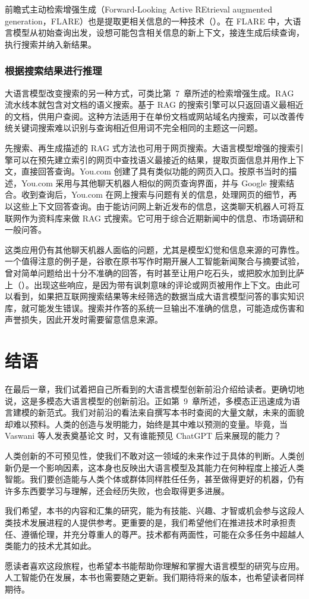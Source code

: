 前瞻式主动检索增强生成（Forward-Looking Active REtrieval augmented generation，FLARE）也是提取更相关信息的一种技术（）。在 FLARE 中，大语言模型从初始查询出发，设想可能包含相关信息的新上下文，接连生成后续查询，执行搜索并纳入新结果。

\subsubsection*{根据搜索结果进行推理}
大语言模型改变搜索的另一种方式，可类比第~7~章所述的检索增强生成。RAG 流水线本就包含对文档的语义搜索。基于 RAG 的搜索引擎可以只返回语义最相近的文档，供用户查阅。这种方法适用于在单份文档或网站域名内搜索，可以改善传统关键词搜索难以识别与查询相近但用词不完全相同的主题这一问题。

先搜索、再生成描述的 RAG 式方法也可用于网页搜索。大语言模型增强的搜索引擎可以在预先建立索引的网页中查找语义最接近的结果，提取页面信息并用作上下文，直接回答查询。You.com 创建了具有类似功能的网页入口。按原书当时的描述，You.com 采用与其他聊天机器人相似的网页查询界面，并与 Google 搜索结合。收到查询后，You.com 在网上搜索与问题有关的信息，处理网页的细节，再以这些上下文回答查询。由于能访问网上新近发布的信息，这类聊天机器人可将互联网作为资料库来做 RAG 式搜索。它可用于综合近期新闻中的信息、市场调研和一般问答。

这类应用仍有其他聊天机器人面临的问题，尤其是模型幻觉和信息来源的可靠性。一个值得注意的例子是，谷歌在原书写作时期开展人工智能新闻聚合与摘要试验，曾对简单问题给出十分不准确的回答，有时甚至让用户吃石头，或把胶水加到比萨上（）。出现这些响应，是因为带有讽刺意味的评论或网页被用作上下文。由此可以看到，如果把互联网搜索结果等未经筛选的数据当成大语言模型问答的事实知识库，就可能发生错误。搜索并作答的系统一旦输出不准确的信息，可能造成伤害和声誉损失，因此开发时需要留意信息来源。

\section{结语}
\label{sec:ch10-closing}
在最后一章，我们试着把自己所看到的大语言模型创新前沿介绍给读者。更确切地说，这是多模态大语言模型的创新前沿。正如第~9~章所述，多模态正迅速成为语言建模的新范式。我们对前沿的看法来自撰写本书时查阅的大量文献，未来的面貌却难以预料。人类的创造与发明能力，始终是其中难以预测的变量。毕竟，当 Vaswani 等人发表奠基论文  时，又有谁能预见 ChatGPT 后来展现的能力？

人类创新的不可预见性，使我们不敢对这一领域的未来作过于具体的判断。人类创新仍是一个影响因素，这本身也反映出大语言模型及其能力在何种程度上接近人类智能。我们要创造能与人类个体或群体同样胜任任务，甚至做得更好的机器，仍有许多东西要学习与理解，还会经历失败，也会取得更多进展。

我们希望，本书的内容和汇集的研究，能为有技能、兴趣、才智或机会参与这段人类技术发展进程的人提供参考。更重要的是，我们希望他们在推进技术时承担责任、遵循伦理，并充分尊重人的尊严。技术都有两面性，可能在众多任务中超越人类能力的技术尤其如此。

愿读者喜欢这段旅程，也希望本书能帮助你理解和掌握大语言模型的研究与应用。人工智能仍在发展，本书也需要随之更新。我们期待将来的版本，也希望读者同样期待。
